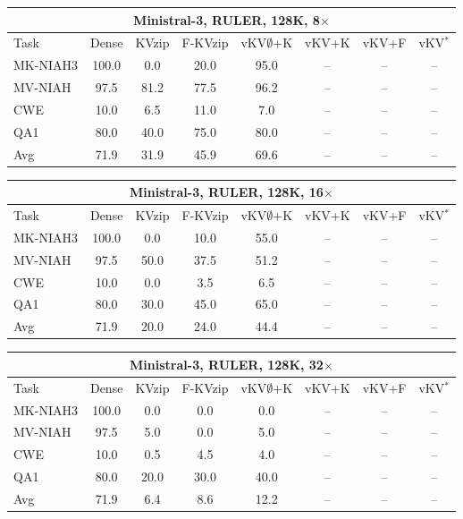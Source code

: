 \begin{tabular}{lccccccc}
\toprule
\multicolumn{8}{c}{Ministral-3, RULER, 128K, 8$\times$} \\
\midrule
Task & Dense & KVzip & F-KVzip & vKV$\emptyset$+K & vKV+K & vKV+F & vKV$^\ast$ \\
\midrule
MK-NIAH3 & 100.0 & 0.0 & 20.0 & 95.0 & -- & -- & -- \\
MV-NIAH & 97.5 & 81.2 & 77.5 & 96.2 & -- & -- & -- \\
CWE & 10.0 & 6.5 & 11.0 & 7.0 & -- & -- & -- \\
QA1 & 80.0 & 40.0 & 75.0 & 80.0 & -- & -- & -- \\
\midrule
Avg & 71.9 & 31.9 & 45.9 & 69.6 & -- & -- & -- \\
\bottomrule
\end{tabular}
\vspace{0.8em}

\begin{tabular}{lccccccc}
\toprule
\multicolumn{8}{c}{Ministral-3, RULER, 128K, 16$\times$} \\
\midrule
Task & Dense & KVzip & F-KVzip & vKV$\emptyset$+K & vKV+K & vKV+F & vKV$^\ast$ \\
\midrule
MK-NIAH3 & 100.0 & 0.0 & 10.0 & 55.0 & -- & -- & -- \\
MV-NIAH & 97.5 & 50.0 & 37.5 & 51.2 & -- & -- & -- \\
CWE & 10.0 & 0.0 & 3.5 & 6.5 & -- & -- & -- \\
QA1 & 80.0 & 30.0 & 45.0 & 65.0 & -- & -- & -- \\
\midrule
Avg & 71.9 & 20.0 & 24.0 & 44.4 & -- & -- & -- \\
\bottomrule
\end{tabular}
\vspace{0.8em}

\begin{tabular}{lccccccc}
\toprule
\multicolumn{8}{c}{Ministral-3, RULER, 128K, 32$\times$} \\
\midrule
Task & Dense & KVzip & F-KVzip & vKV$\emptyset$+K & vKV+K & vKV+F & vKV$^\ast$ \\
\midrule
MK-NIAH3 & 100.0 & 0.0 & 0.0 & 0.0 & -- & -- & -- \\
MV-NIAH & 97.5 & 5.0 & 0.0 & 5.0 & -- & -- & -- \\
CWE & 10.0 & 0.5 & 4.5 & 4.0 & -- & -- & -- \\
QA1 & 80.0 & 20.0 & 30.0 & 40.0 & -- & -- & -- \\
\midrule
Avg & 71.9 & 6.4 & 8.6 & 12.2 & -- & -- & -- \\
\bottomrule
\end{tabular}
\vspace{0.8em}

